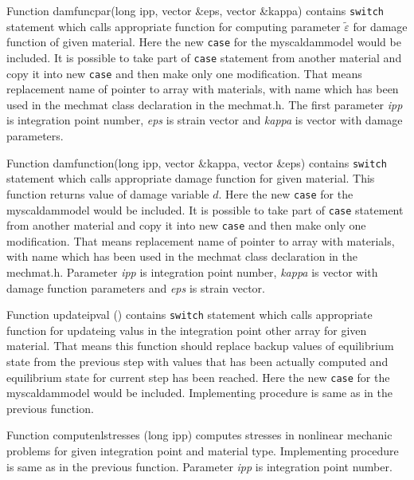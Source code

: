 Function {\sf damfuncpar(long ipp, vector \&eps, vector \&kappa)} contains {\tt switch} statement which calls
appropriate function for computing parameter $\tilde{\varepsilon}$ for damage function of given material. Here the new
{\tt case} for the  {\sf myscaldammodel} would be included. It is possible to take part of {\tt case} statement from
another material and copy it into new {\tt case} and then make only one modification. That means replacement
name of pointer to array with materials, with name which has been used in the {\sf mechmat} class declaration in the mechmat.h.
The first parameter {\it ipp} is integration point number, {\it eps} is strain vector and {\it kappa} is vector with
damage parameters.

Function {\sf damfunction(long ipp, vector \&kappa, vector \&eps)} contains {\tt switch} statement which calls
appropriate damage function for given material. This function returns value of damage variable $d$. Here the new
{\tt case} for the  {\sf myscaldammodel} would be included. It is possible to take part of {\tt case} statement from
another material and copy it into new {\tt case} and then make only one modification. That means replacement name of pointer
to array with materials, with name which has been used in the {\sf mechmat} class declaration in the mechmat.h.
Parameter {\it ipp} is integration point number, {\it kappa} is vector with damage function parameters and {\it eps} is
strain vector.

Function {\sf updateipval ()} contains {\tt switch} statement which calls appropriate function for updateing valus in the
integration point {\sf other} array for given material. That means this function should replace backup values of equilibrium
state from the previous step with values that has been actually computed and equilibrium state for current step
has been reached. Here the new {\tt case} for the  {\sf myscaldammodel} would be included. Implementing procedure is same
as in the previous function.

Function {\sf computenlstresses (long ipp)} computes stresses in nonlinear mechanic problems for given integration
point and material type. Implementing procedure is same as in the previous function. Parameter {\it ipp} is integration
point number.
